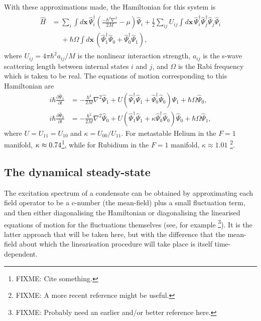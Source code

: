 With these approximations made, the Hamiltonian for this system is
\begin{align}
    \begin{split}
    \hat{H} &= \sum_i \int d\mathbf{x}\, \hat{\Psi}_i^\dagger \left(\frac{-\hbar^2 \nabla^2}{2 M} - \mu\right)\hat{\Psi}_i^{} + \frac{1}{2} \sum_{i j} U_{i j}\int d\mathbf{x}\, \hat{\Psi}_i^\dagger \hat{\Psi}_j^\dagger \hat{\Psi}_j^{} \hat{\Psi}_i^{}\\
            &\phantom{=} + \hbar \Omega \int d\mathbf{x}\, \left(\hat{\Psi}_1^\dagger \hat{\Psi}_0^{} + \hat{\Psi}_0^\dagger \hat{\Psi}_1^{}\right),
    \end{split}
\end{align}
where $U_{ij} = 4\pi \hbar^2 a_{ij}/M$ is the nonlinear interaction strength, $a_{ij}$ is the s-wave scattering length between internal states $i$ and $j$, and $\Omega$ is the Rabi frequency which is taken to be real. The equations of motion corresponding to this Hamiltonian are
\begin{subequations}
    \label{Peaks:OperatorEquationsOfMotion}
    \begin{align}
    i \hbar \frac{\partial \hat{\Psi}_1}{\partial t}  &= -\frac{\hbar^2}{2M}\nabla^2 \hat{\Psi}_1  + U \left(\hat{\Psi}_1^\dagger \hat{\Psi}_1^{} + \hat{\Psi}_0^\dagger \hat{\Psi}_0^{}\right) \hat{\Psi}_1^{} + \hbar \Omega \hat{\Psi}_0^{},  \\
    i \hbar \frac{\partial \hat{\Psi}_0}{\partial t} &= -\frac{\hbar^2}{2M} \nabla^2 \hat{\Psi}_0 + U \left(\hat{\Psi}_1^\dagger \hat{\Psi}_1^{} + \kappa \hat{\Psi}_0^\dagger \hat{\Psi}_0^{} \right) \hat{\Psi}_0^{} + \hbar \Omega \hat{\Psi}_1^{},
    \end{align}
\end{subequations}
where $U=U_{11}=U_{10}$ and $\kappa = U_{00}/U_{11}$. For metastable Helium in the $F=1$ manifold, $\protect{\kappa \approx 0.74}$\footnote{FIXME: Cite something.}, while for Rubidium in the $F=1$ manifold, $\kappa \approx 1.01$ \cite{Ho:1998}\footnote{FIXME: A more recent reference might be useful.}. 

\subsection{The dynamical steady-state}

The excitation spectrum of a condensate can be obtained by approximating each field operator to be a c-number (the mean-field) plus a small fluctuation term, and then either diagonalising the Hamiltonian \cite{Bogoliubov:1947,FetterWalecka} or diagonalising the linearised equations of motion for the fluctuations themselves (see, for example \cite{Ho:1998}\footnote{FIXME: Probably need an earlier and/or better reference here.}). It is the latter approach that will be taken here, but with the difference that the mean-field about which the linearisation procedure will take place is itself time-dependent.


